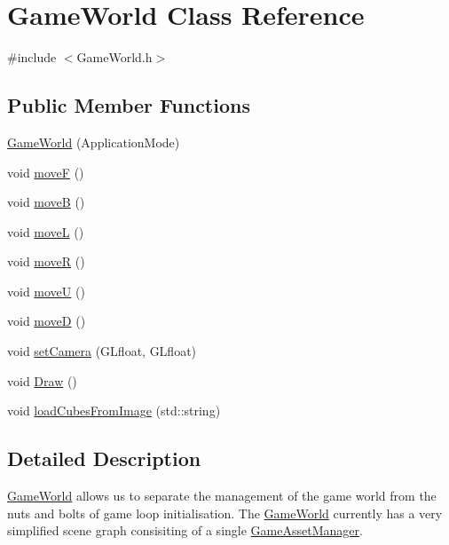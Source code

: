\hypertarget{classGameWorld}{}\section{Game\+World Class Reference}
\label{classGameWorld}


{\ttfamily \#include $<$Game\+World.\+h$>$}

\subsection*{Public Member Functions}
\begin{DoxyCompactItemize}
\item 
\hyperlink{classGameWorld_a17a84e57a80600961088afc753036f89}{Game\+World} (Application\+Mode)
\item 
void \hyperlink{classGameWorld_a4e3d5cbb6241c8db5d7e74af509a02c1}{moveF} ()
\item 
void \hyperlink{classGameWorld_a1c5c6bd707c87d80573e558ab8ce018a}{moveB} ()
\item 
void \hyperlink{classGameWorld_af1728ec61cd2016030821261c8f79c34}{moveL} ()
\item 
void \hyperlink{classGameWorld_ab59dfdd281fac21eb6f2680711188598}{moveR} ()
\item 
void \hyperlink{classGameWorld_a219d46bb16bfb526bcf9b6957515d063}{moveU} ()
\item 
void \hyperlink{classGameWorld_a32b9c8230ef13f29e03f38b43e015ad9}{moveD} ()
\item 
void \hyperlink{classGameWorld_a71f6a1467ce47501dbcafd5a2cbfb1a2}{set\+Camera} (G\+Lfloat, G\+Lfloat)
\item 
void \hyperlink{classGameWorld_a275418607d8286979b276f165ad5876b}{Draw} ()
\item 
void \hyperlink{classGameWorld_abd2600f14a82010bfd39dc25a782fa59}{load\+Cubes\+From\+Image} (std\+::string)
\end{DoxyCompactItemize}


\subsection{Detailed Description}
\hyperlink{classGameWorld}{Game\+World} allows us to separate the management of the game world from the nuts and bolts of game loop initialisation. The \hyperlink{classGameWorld}{Game\+World} currently has a very simplified scene graph consisiting of a single \hyperlink{classGameAssetManager}{Game\+Asset\+Manager}. 

